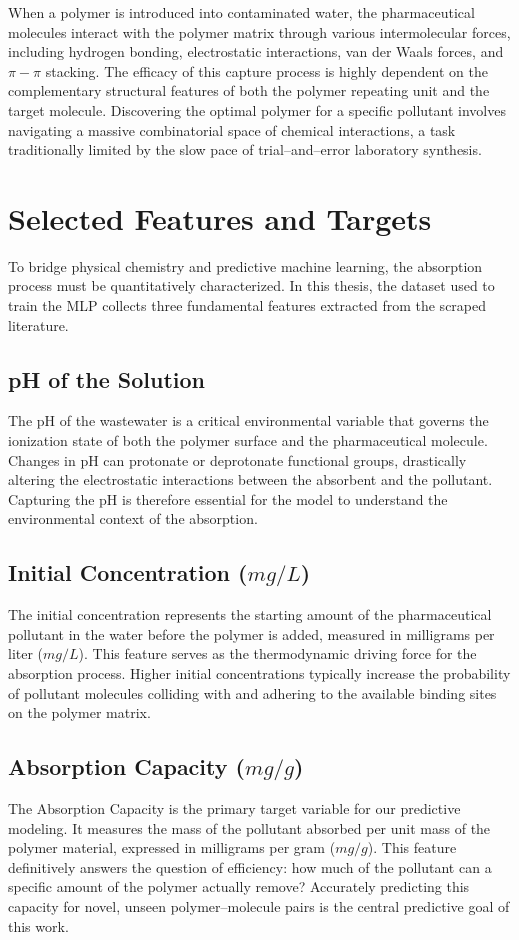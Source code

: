 When a polymer is introduced into contaminated water, the pharmaceutical molecules interact with the polymer matrix through various intermolecular forces, including hydrogen bonding, electrostatic interactions, van der Waals forces, and $\pi-\pi$ stacking.  The efficacy of this capture process is highly dependent on the complementary structural features of both the polymer repeating unit and the target molecule. Discovering the optimal polymer for a specific pollutant involves navigating a massive combinatorial space of chemical interactions, a task traditionally limited by the slow pace of trial--and--error laboratory synthesis.

\section{Selected Features and Targets}
\label{sec:selected_features}

To bridge physical chemistry and predictive machine learning, the absorption process must be quantitatively characterized.  In this thesis, the dataset used to train the MLP collects three fundamental features extracted from the scraped literature.

\subsection*{pH of the Solution}
The pH of the wastewater is a critical environmental variable that governs the ionization state of both the polymer surface and the pharmaceutical molecule. Changes in pH can protonate or deprotonate functional groups, drastically altering the electrostatic interactions between the absorbent and the pollutant. Capturing the pH is therefore essential for the model to understand the environmental context of the absorption.

\subsection*{Initial Concentration ($mg/L$)}
The initial concentration represents the starting amount of the pharmaceutical pollutant in the water before the polymer is added, measured in milligrams per liter ($mg/L$). This feature serves as the thermodynamic driving force for the absorption process. Higher initial concentrations typically increase the probability of pollutant molecules colliding with and adhering to the available binding sites on the polymer matrix.

\subsection*{Absorption Capacity ($mg/g$)}
The Absorption Capacity is the primary target variable for our predictive modeling. It measures the mass of the pollutant absorbed per unit mass of the polymer material, expressed in milligrams per gram ($mg/g$).  This feature definitively answers the question of efficiency: how much of the pollutant can a specific amount of the polymer actually remove? Accurately predicting this capacity for novel, unseen polymer--molecule pairs is the central predictive goal of this work.


